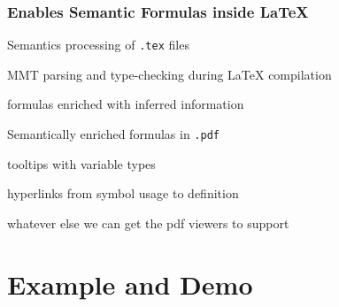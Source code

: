 \begin{frame}\frametitle{Enables Semantic Formulas inside LaTeX}
\begin{blockitems}{Semantics processing of \texttt{.tex} files}
\item MMT parsing and type-checking during LaTeX compilation
\item formulas enriched with inferred information
\end{blockitems}

\begin{blockitems}{Semantically enriched formulas in \texttt{.pdf}}
\item tooltips with variable types
\item hyperlinks from symbol usage to definition
\item whatever else we can get the pdf viewers to support
\end{blockitems}
\end{frame}

\section{Example and Demo}

